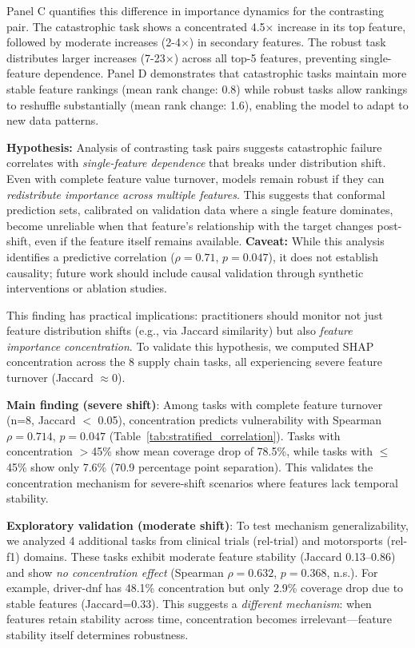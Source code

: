 \documentclass[sigconf]{acmart}
\begin{document}
Panel C quantifies this difference in importance dynamics for the contrasting pair. The catastrophic task shows a concentrated 4.5× increase in its top feature, followed by moderate increases (2-4×) in secondary features. The robust task distributes larger increases (7-23×) across all top-5 features, preventing single-feature dependence. Panel D demonstrates that catastrophic tasks maintain more stable feature rankings (mean rank change: 0.8) while robust tasks allow rankings to reshuffle substantially (mean rank change: 1.6), enabling the model to adapt to new data patterns.

\textbf{Hypothesis:} Analysis of contrasting task pairs suggests catastrophic failure correlates with \emph{single-feature dependence} that breaks under distribution shift. Even with complete feature value turnover, models remain robust if they can \emph{redistribute importance across multiple features}. This suggests that conformal prediction sets, calibrated on validation data where a single feature dominates, become unreliable when that feature's relationship with the target changes post-shift, even if the feature itself remains available. \textbf{Caveat:} While this analysis identifies a predictive correlation ($\rho=0.71$, $p=0.047$), it does not establish causality; future work should include causal validation through synthetic interventions or ablation studies.

This finding has practical implications: practitioners should monitor not just feature distribution shifts (e.g., via Jaccard similarity) but also \emph{feature importance concentration}. To validate this hypothesis, we computed SHAP concentration across the 8 supply chain tasks, all experiencing severe feature turnover (Jaccard $\approx$0).

\textbf{Main finding (severe shift)}: Among tasks with complete feature turnover (n=8, Jaccard $<$ 0.05), concentration predicts vulnerability with Spearman $\rho=0.714$, $p=0.047$ (Table~\ref{tab:stratified_correlation}). Tasks with concentration $>$45\% show mean coverage drop of 78.5\%, while tasks with $\leq$45\% show only 7.6\% (70.9 percentage point separation). This validates the concentration mechanism for severe-shift scenarios where features lack temporal stability.

\textbf{Exploratory validation (moderate shift)}: To test mechanism generalizability, we analyzed 4 additional tasks from clinical trials (rel-trial) and motorsports (rel-f1) domains. These tasks exhibit moderate feature stability (Jaccard 0.13--0.86) and show \textit{no concentration effect} (Spearman $\rho=0.632$, $p=0.368$, n.s.). For example, driver-dnf has 48.1\% concentration but only 2.9\% coverage drop due to stable features (Jaccard=0.33). This suggests a \textit{different mechanism}: when features retain stability across time, concentration becomes irrelevant---feature stability itself determines robustness.
\end{document}
